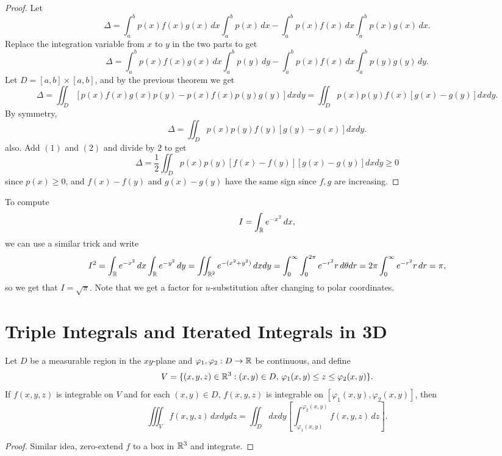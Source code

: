 \begin{proof}
  Let
  \[
  \Delta = \int_a^b p(x)f(x)g(x)\, dx \int_a^b p(x)\, dx - \int_a^b p(x)f(x)\, dx \int_a^b p(x)g(x)\, dx.
  \]
  Replace the integration variable from $x$ to $y$ in the
  two parts to get
  \[
    \Delta = \int_a^b p(x)f(x)g(x)\, dx \int_a^b p(y)\, dy
    - \int_a^b p(x)f(x)\, dx \int_a^b p(y)g(y)\, dy
  .\]
  Let $D = [a, b] \times [a, b]$, and by the previous
  theorem we get
  \[
    \Delta
    = \iint_D \left[p(x) f(x) g(x) p(y) - p(x) f(x) p(y) g(y)\right] dx dy
    = \iint_D p(x)p(y)f(x)\left[g(x) - g(y)\right] dx dy. \tag{1}
  \]
  By symmetry,
  \[
    \Delta = \iint_D p(x)p(y)f(y) \left[g(y) - g(x)\right] dx dy \tag{2}.
  \]
  also. Add $(1)$ and $(2)$ and divide by $2$ to get
  \[
    \Delta = \frac{1}{2} \iint_D p(x) p(y) [f(x) - f(y)][g(x) - g(y)] dx dy \ge 0
  \]
  since $p(x) \ge 0$, and $f(x) - f(y)$ and
  $g(x) - g(y)$ have the same sign since $f, g$ are
  increasing.
\end{proof}

\begin{example}
  To compute
  \[
    I = \int_{\mathbb{R}} e^{-x^2} \, dx,
  \]
  we can use a similar trick and write
  \[
    I^2 = \int_{\mathbb{R}} e^{-x^2} \, dx \int_{\mathbb{R}} e^{-y^2} \, dy
    = \iint_{\mathbb{R}^2} e^{-(x^2 + y^2)} \, dx dy
    = \int_0^\infty \int_0^{2\pi} e^{-r^2} r \, d\theta dr
    = 2\pi \int_0^\infty e^{-r^2} r \, dr
    = \pi,
  \]
  so we get that $I = \sqrt{\pi}$. Note that we
  get a factor for $u$-substitution after changing to
  polar coordinates.
\end{example}

\section{Triple Integrals and Iterated Integrals in 3D}
\begin{theorem}
  Let $D$ be a measurable region in the $xy$-plane and
  $\varphi_1, \varphi_2 : D \to \mathbb{R}$ be continuous, and
  define
  \[
    V = \{(x, y, z) \in \mathbb{R}^3 : (x, y) \in D,\, \varphi_1(x, y) \le z \le \varphi_2(x, y)\}.
  \]
  If $f(x, y, z)$ is integrable on $V$ and for each
  $(x, y) \in D$, $f(x, y, z)$ is integrable on
  $[\varphi_1(x, y), \varphi_2(x, y)]$, then
  \[
    \iiint_V f(x, y, z)\, dx dy dz
    = \iint_D dxdy \left[\int_{\varphi_1(x, y)}^{\varphi_2(x, y)} f(x, y, z)\, dz\right].
  \]
\end{theorem}

\begin{proof}
  Similar idea, zero-extend $f$ to a box in $\mathbb{R}^3$ and
  integrate.
\end{proof}

